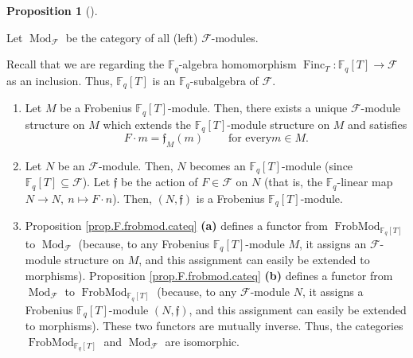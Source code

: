 \documentclass[numbers=enddot,12pt,final,onecolumn,notitlepage]{scrartcl}%
\theoremstyle{definition}
\newtheorem{prop}[theo]{Proposition}
\newenvironment{proposition}[1][]
{\begin{prop}[#1]\begin{leftbar}}
{\end{leftbar}\end{prop}}
\begin{document}
\begin{proposition}
\label{prop.F.frobmod.cateq}Let $\operatorname*{Mod}\nolimits_{\mathcal{F}}$
be the category of all (left) $\mathcal{F}$-modules.

Recall that we are regarding the $\mathbb{F}_{q}$-algebra homomorphism
$\operatorname*{Finc}\nolimits_{T}:\mathbb{F}_{q}\left[  T\right]
\rightarrow\mathcal{F}$ as an inclusion. Thus, $\mathbb{F}_{q}\left[
T\right]  $ is an $\mathbb{F}_{q}$-subalgebra of $\mathcal{F}$.

\begin{enumerate}
\item[\textbf{(a)}] Let $M$ be a Frobenius $\mathbb{F}_{q}\left[  T\right]
$-module. Then, there exists a unique $\mathcal{F}$-module structure on $M$
which extends the $\mathbb{F}_{q}\left[  T\right]  $-module structure on $M$
and satisfies%
\[
F\cdot m=\mathfrak{f}_{M}\left(  m\right)  \ \ \ \ \ \ \ \ \ \ \text{for every
}m\in M.
\]


\item[\textbf{(b)}] Let $N$ be an $\mathcal{F}$-module. Then, $N$ becomes an
$\mathbb{F}_{q}\left[  T\right]  $-module (since $\mathbb{F}_{q}\left[
T\right]  \subseteq\mathcal{F}$). Let $\mathfrak{f}$ be the action of
$F\in\mathcal{F}$ on $N$ (that is, the $\mathbb{F}_{q}$-linear map
$N\rightarrow N,\ n\mapsto F\cdot n$). Then, $\left(  N,\mathfrak{f}\right)  $
is a Frobenius $\mathbb{F}_{q}\left[  T\right]  $-module.

\item[\textbf{(c)}] Proposition \ref{prop.F.frobmod.cateq} \textbf{(a)}
defines a functor from $\operatorname*{FrobMod}\nolimits_{\mathbb{F}%
_{q}\left[  T\right]  }$ to $\operatorname*{Mod}\nolimits_{\mathcal{F}}$
(because, to any Frobenius $\mathbb{F}_{q}\left[  T\right]  $-module $M$, it
assigns an $\mathcal{F}$-module structure on $M$, and this assignment can
easily be extended to morphisms). Proposition \ref{prop.F.frobmod.cateq}
\textbf{(b)} defines a functor from $\operatorname*{Mod}\nolimits_{\mathcal{F}%
}$ to $\operatorname*{FrobMod}\nolimits_{\mathbb{F}_{q}\left[  T\right]  }$
(because, to any $\mathcal{F}$-module $N$, it assigns a Frobenius
$\mathbb{F}_{q}\left[  T\right]  $-module $\left(  N,\mathfrak{f}\right)  $,
and this assignment can easily be extended to morphisms). These two functors
are mutually inverse. Thus, the categories $\operatorname*{FrobMod}%
\nolimits_{\mathbb{F}_{q}\left[  T\right]  }$ and $\operatorname*{Mod}%
\nolimits_{\mathcal{F}}$ are isomorphic.
\end{enumerate}
\end{proposition}
\end{document}
